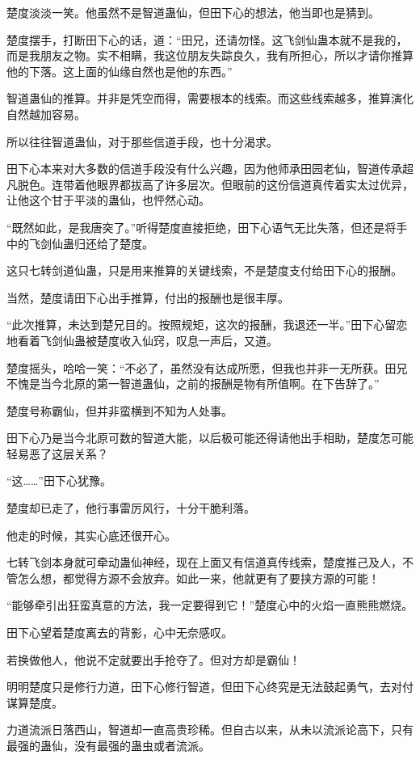 \begin{this_body}
楚度淡淡一笑。他虽然不是智道蛊仙，但田下心的想法，他当即也是猜到。

楚度摆手，打断田下心的话，道：“田兄，还请勿怪。这飞剑仙蛊本就不是我的，而是我朋友之物。实不相瞒，我这位朋友失踪良久，我有所担心，所以才请你推算他的下落。这上面的仙缘自然也是他的东西。”

智道蛊仙的推算。并非是凭空而得，需要根本的线索。而这些线索越多，推算演化自然越加容易。

所以往往智道蛊仙，对于那些信道手段，也十分渴求。

田下心本来对大多数的信道手段没有什么兴趣，因为他师承田园老仙，智道传承超凡脱色。连带着他眼界都拔高了许多层次。但眼前的这份信道真传着实太过优异，让他这个甘于平淡的蛊仙，也怦然心动。

“既然如此，是我唐突了。”听得楚度直接拒绝，田下心语气无比失落，但还是将手中的飞剑仙蛊归还给了楚度。

这只七转剑道仙蛊，只是用来推算的关键线索，不是楚度支付给田下心的报酬。

当然，楚度请田下心出手推算，付出的报酬也是很丰厚。

“此次推算，未达到楚兄目的。按照规矩，这次的报酬，我退还一半。”田下心留恋地看着飞剑仙蛊被楚度收入仙窍，叹息一声后，又道。

楚度摇头，哈哈一笑：“不必了，虽然没有达成所愿，但我也并非一无所获。田兄不愧是当今北原的第一智道蛊仙，之前的报酬是物有所值啊。在下告辞了。”

楚度号称霸仙，但并非蛮横到不知为人处事。

田下心乃是当今北原可数的智道大能，以后极可能还得请他出手相助，楚度怎可能轻易恶了这层关系？

“这……”田下心犹豫。

楚度却已走了，他行事雷厉风行，十分干脆利落。

他走的时候，其实心底还很开心。

七转飞剑本身就可牵动蛊仙神经，现在上面又有信道真传线索，楚度推己及人，不管怎么想，都觉得方源不会放弃。如此一来，他就更有了要挟方源的可能！

“能够牵引出狂蛮真意的方法，我一定要得到它！”楚度心中的火焰一直熊熊燃烧。

田下心望着楚度离去的背影，心中无奈感叹。

若换做他人，他说不定就要出手抢夺了。但对方却是霸仙！

明明楚度只是修行力道，田下心修行智道，但田下心终究是无法鼓起勇气，去对付谋算楚度。

力道流派日落西山，智道却一直高贵珍稀。但自古以来，从未以流派论高下，只有最强的蛊仙，没有最强的蛊虫或者流派。


\end{this_body}
